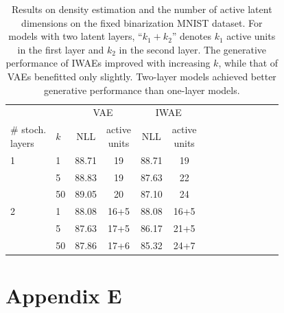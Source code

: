 \documentclass{article} %
\newcommand{\numSamples}{k}
\begin{document}
\begin{table}[htbp]
\vspace{-0.3in}
\begin{center}
\begin{tabular}{@{}ll cc cc cc cc cc cc@{}}

              &     & \multicolumn{2}{c}{VAE} & \multicolumn{2}{c}{IWAE} \\
\cmidrule(r){3-4} \cmidrule(l){5-6}  
\shortstack{\# stoch. \\ layers} & $\numSamples$ & NLL               & \shortstack{active \\ units}             & NLL               & \shortstack{active \\ units}   \\ 
\cmidrule(lr){1-1} \cmidrule(lr){2-2} \cmidrule(lr){3-3}\cmidrule(lr){4-4}\cmidrule(lr){5-5}\cmidrule(lr){6-6} \cmidrule(lr){7-7}      \midrule
1             & 1   & 88.71 &  19  & 88.71 &  19   \\
              & 5   & 88.83 &  19  & 87.63 &  22   \\
              & 50  & 89.05 &  20  & 87.10 &  24   \\ \midrule
2             & 1   & 88.08 &  16+5 & 88.08 &  16+5 \\
              & 5   & 87.63 &  17+5 & 86.17&  21+5 \\
              & 50  & 87.86 &  17+6 & 85.32&  24+7 \\ \bottomrule
\end{tabular}
\end{center}
\vspace{-0.1in}
\caption{\small Results on density estimation and the number of active latent dimensions on the fixed binarization MNIST dataset. For models with two latent layers, ``$k_1+k_2$'' denotes $k_1$ active units in the first layer and $k_2$ in the second layer. The generative performance of IWAEs improved with increasing $\numSamples$, while that of VAEs benefitted only slightly. Two-layer models achieved better generative performance than one-layer models. }
\label{tbl:results_bin_fix}
\end{table}

\section*{Appendix E}
\label{app:samples}
\end{document}
